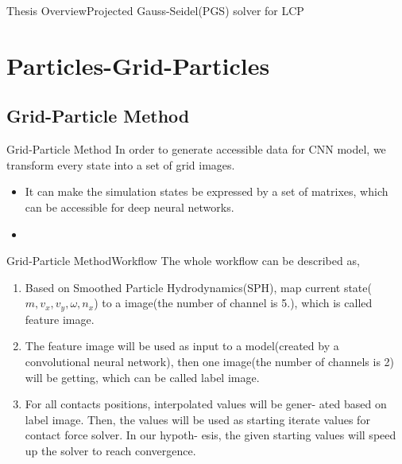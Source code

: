 \documentclass{beamer}
\begin{document}
\begin{frame}{Thesis Overview}{Projected Gauss-Seidel(PGS) solver for LCP}
\begin{algorithm}[H]
\end{algorithm}
\end{frame}

\section{Particles-Grid-Particles}

\subsection{Grid-Particle Method}
\begin{frame}{Grid-Particle Method}
In order to generate accessible data for CNN model, we transform every state into a set of grid images.
\begin{itemize}
\item {It can make the simulation states be expressed by a set of matrixes, which can be accessible for deep neural networks.
    \pause
}
\item {}
\end{itemize}
\end{frame}
\begin{frame}{Grid-Particle Method}{Workflow}
The whole workflow can be described as,
\begin{enumerate}
\item {
Based on Smoothed Particle Hydrodynamics(SPH), map current state(\(m, v_x, v_y, \omega, n_x\)) to a image(the number of channel is 5.), which is called feature image.
\pause
}
\item {
The feature image will be used as input to a model(created by a convolutional neural network), then one image(the number of channels is 2) will be getting, which can be called label image.
\pause
}
\item {
For all contacts positions, interpolated values will be gener- ated based on label image. Then, the values will be used as starting iterate values for contact force solver. In our hypoth- esis, the given starting values will speed up the solver to reach convergence.
}

\end{enumerate}
\end{frame}
\end{document}
